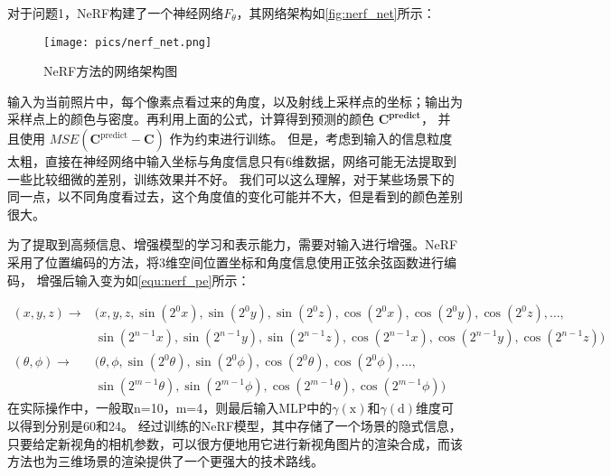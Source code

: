 \par 对于问题1，NeRF构建了一个神经网络$F_\theta$，其网络架构如\autoref{fig:nerf_net}所示：
\begin{figure}[htbp]
    \centering
    \texttt{[image: pics/nerf\_net.png]}
    \caption{\label{fig:nerf_net}NeRF方法的网络架构图}
\end{figure}




\par 输入为当前照片中，每个像素点看过来的角度，以及射线上采样点的坐标；输出为采样点上的颜色与密度。再利用上面的公式，计算得到预测的颜色 
\(\boldsymbol{C^{\text{predict}}}\)，
并且使用 $MSE(\boldsymbol{C}^{\text{predict}} - \boldsymbol{C})$ 作为约束进行训练。
但是，考虑到输入的信息粒度太粗，直接在神经网络中输入坐标与角度信息只有6维数据，网络可能无法提取到一些比较细微的差别，训练效果并不好。
我们可以这么理解，对于某些场景下的同一点，以不同角度看过去，这个角度值的变化可能并不大，但是看到的颜色差别很大。
\par 为了提取到高频信息、增强模型的学习和表示能力，需要对输入进行增强。NeRF采用了位置编码的方法，将3维空间位置坐标和角度信息使用正弦余弦函数进行编码，
增强后输入变为如\autoref{equ:nerf_pe}所示：

\begin{equation}
    \label{equ:nerf_pe}
    \begin{aligned}
        (x,y,z) \to & (x,y,z, \sin(2^0 x), \sin(2^0 y), \sin(2^0 z), \cos(2^0 x), \cos(2^0 y), \cos(2^0 z), \ldots, \\
                    & \sin(2^{n-1} x), \sin(2^{n-1} y), \sin(2^{n-1} z), \cos(2^{n-1} x), \cos(2^{n-1} y), \cos(2^{n-1} z)) \\
        (\theta,\phi) \to & (\theta,\phi, \sin(2^0 \theta), \sin(2^0 \phi), \cos(2^0 \theta), \cos(2^0 \phi), \ldots, \\
                          & \sin(2^{m-1} \theta), \sin(2^{m-1} \phi), \cos(2^{m-1} \theta), \cos(2^{m-1} \phi))
    \end{aligned}
\end{equation}
在实际操作中，一般取n=10，m=4，则最后输入MLP中的\(\gamma(\mathrm{x})\)和\(\gamma(\mathrm{d})\)维度可以得到分别是60和24。
	经过训练的NeRF模型，其中存储了一个场景的隐式信息，只要给定新视角的相机参数，可以很方便地用它进行新视角图片的渲染合成，而该方法也为三维场景的渲染提供了一个更强大的技术路线。


